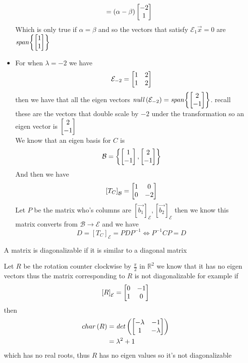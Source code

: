 \documentclass[11pt]{book}
\begin{document}
\begin{eg}
\begin{itemize}
\begin{align*}
                                                                &= \left( \alpha  - \beta  \right) \mat{ -2 \\ 1 } 
            \end{align*}
            Which is only true if $\alpha = \beta $ and so the vectors that satisfy $\mathcal{E} _{1} \vec{x} = 0$ are $\mathit{span} {\left\{ \mat{ 1 \\ 1 }  \right\} } $ 
        \item For when $\lambda = -2$ we have 
            \[
            \mathcal{E} _{-2} = \mat[b]{ 1 & 2 \\ 1 & 2 }
            \]
            then we have that all the eigen vectors $\mathit{null} \left(\mathcal{E} _{-2} \right) = \mathit{span} {\left\{ \mat{ 2 \\ -1 }  \right\} }  $. recall these are the vectors that double scale by $-2$ under the transformation so an eigen vector is $\mat{ 2 \\ -1 } $\\
            We know that an eigen basis for $C$ is 
            \[
            \mathcal{B} = \left\{ \mat{ 1 \\ -1 } , \mat{ 2 \\ -1 }  \right\} 
            \]
            And then we have
            \[
            \left[ T_{C}  \right]_{\mathcal{B}} = \mat[b]{ 1 & 0 \\ 0 & -2 }
            \]
            Let $P$ be the matrix who's columns are $\left[ \vec{b_1}  \right]_{\mathcal{E}} ,\left[ \vec{b_2}  \right]_{\mathcal{E}} $ then we know this matrix converts from $\mathcal{B} \to \mathcal{E} $ and we have 
            \[
            D = \left[ T_{C}  \right]_{\mathcal{E}} = PDP^{-1} \Leftrightarrow P^{-1} CP= D
            \]
    \end{itemize}
\end{eg}

\begin{defn}[Diagonizable]\label{defn:diagonizable}
    A matrix is diagonalizable if it is similar to a diagonal matrix  
\end{defn}

\begin{eg}
    Let $R$ be the rotation counter clockwise by $\frac{\pi}{2} $ in $\mathbb{R} ^2 $ we know that it has no eigen vectors thus the matrix corresponding to $R$ is not diagonalizable for example if 
    \[
    \left[ {R}  \right]_{\mathcal{E}} = \mat[b]{ 0 & -1 \\ 1 & 0 }
    \]
    then 
    \begin{align*}
        char\left(R\right) &= \mathit{det} \left(\mat[b]{  - \lambda  & -1 \\ 1 &  - \lambda  }\right)   \\
        &= \lambda ^2  + 1 
    \end{align*}
    which has no real roots, thus $R$ has no eigen values so it's not diagonalizable 
\end{eg}
\end{document}
